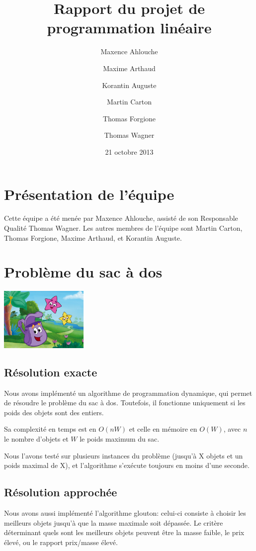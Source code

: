 \documentclass{scrartcl}
\begin{document}
\title{Rapport du projet de programmation linéaire}
\author{Maxence Ahlouche \and Maxime Arthaud \and Korantin Auguste
          \and Martin Carton \and Thomas Forgione \and Thomas Wagner}
\date{21 octobre 2013}
\maketitle
\tableofcontents
\newpage

\section{Présentation de l'équipe}
  Cette équipe a été menée par Maxence Ahlouche, assisté de son Responsable
  Qualité Thomas Wagner. Les autres membres de l'équipe sont Martin Carton,
  Thomas Forgione, Maxime Arthaud, et Korantin Auguste.

  
\section{Problème du sac à dos}
  \begin{center}\includegraphics[width=120pt]{sac_a_dos.jpg}\end{center}

  \subsection{Résolution exacte}
    Nous avons implémenté un algorithme de programmation dynamique, qui permet
    de résoudre le problème du sac à dos.  Toutefois, il fonctionne uniquement
    si les poids des objets sont des entiers.

    Sa complexité en temps est en $O(nW)$ et celle en mémoire en $O(W)$, avec
    $n$ le nombre d'objets et $W$ le poids maximum du sac.

    Nous l'avons testé sur plusieurs instances du problème (jusqu'à X objets et
    un poids maximal de X), et l'algorithme s'exécute toujours en moins d'une
    seconde. %

  \subsection{Résolution approchée}
    Nous avons aussi implémenté l'algorithme glouton: celui-ci consiste à
    choisir les \og meilleurs \fg{} objets jusqu'à que la masse maximale soit
    dépassée.  Le critère déterminant quels sont les meilleurs objets peuvent
    être la masse faible, le prix élevé, ou le rapport prix/masse élevé.
\end{document}
